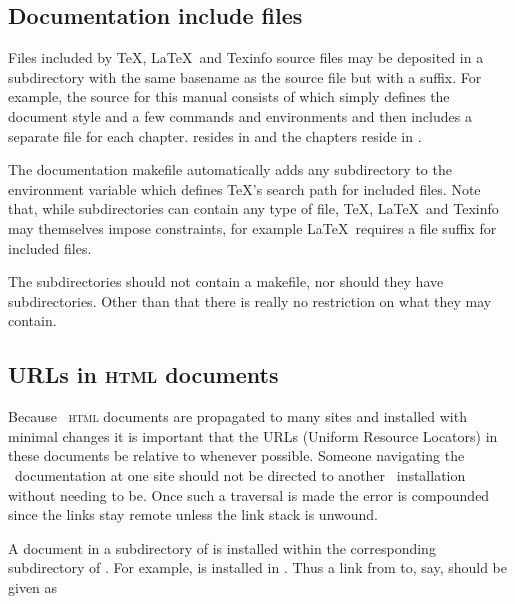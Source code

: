\subsection*{Documentation include files}

Files included by \TeX , \LaTeX\, and Texinfo source files may be deposited in
a subdirectory with the same basename as the source file but with a
 suffix.  For example, the source for this manual consists of
 which simply defines the document style and a few commands
and environments and then includes a separate  file for each
chapter.   resides in  and
the chapters reside in .

The documentation makefile automatically adds any  subdirectory to
the  environment variable which defines \TeX 's search path
for included files.  Note that, while  subdirectories can contain
any type of file, \TeX , \LaTeX\, and Texinfo may themselves impose
constraints, for example \LaTeX\ requires a  file suffix for
included files.

The  subdirectories should not contain a makefile, nor should they
have subdirectories.  Other than that there is really no restriction on
what they may contain.

\subsection*{URLs in \textsc{html} documents}

Because \aipspp\ \textsc{html} documents are propagated to many sites and
installed with minimal changes it is important that the URLs (Uniform Resource
Locators) in these documents be relative to  whenever
possible.  Someone navigating the \aipspp\ documentation at one site should
not be directed to another \aipspp\ installation without needing to be.  Once
such a traversal is made the error is compounded since the links stay remote
unless the link stack is unwound.

A document in a subdirectory of  is installed within the
corresponding subdirectory of .  For example,
 is installed in
.  Thus a link from 
to, say,  should be given as

